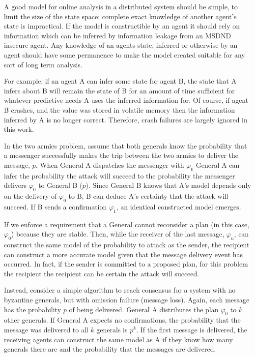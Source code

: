 A good model for online analysis in a distributed system should be simple, to limit the size of the state space: complete exact knowledge of another agent's state is impractical. If the model is constructible by an agent it should rely on information which can be inferred by information leakage from an MSDND insecure agent. Any knowledge of an agents state, inferred or otherwise by an agent should have some permanence to make the model created suitable for any sort of long term analysis. 

For example, if an agent A can infer some state for agent B, the state that A infers about B will remain the state of B for an amount of time sufficient for whatever predictive needs A uses the inferred information for. Of course, if agent B crashes, and the value was stored in volatile memory then the information inferred by A is no longer correct. Therefore, crash failures are largely ignored in this work.

In the two armies problem, assume that both generals know the probability that a messenger successfully makes the trip between the two armies to deliver the message, $p$. When General A dispatches the messenger with $\varphi_0$ General A can infer the probability the attack will succeed to the probability the messenger delivers $\varphi_0$ to General B ($p$). Since General B knows that A's model depends only on the delivery of $\varphi_0$ to B, B can deduce A's certainty that the attack will succeed. If B sends a confirmation $\varphi_1$, an identical constructed model emerges.

If we enforce a requirement that a General cannot reconsider a plan (in this case, $\varphi_0$) because they are stable. Then, while the receiver of the last message, $\varphi_n$, can construct the same model of the probability to attack as the sender, the recipient can construct a more accurate model given that the message delivery event has occurred. In fact, if the sender is committed to a proposed plan, for this problem the recipient the recipient can be certain the attack will succeed.

Instead, consider a simple algorithm to reach consensus for a system with no byzantine generals, but with omission failure (message loss). Again, each message has the probability $p$ of being delivered. General A distributes the plan $\varphi_0$ to $k$ other generals. If General A expects no confirmations, the probability that the message was delivered to all $k$ generals is $p^k$. If the first message is delivered, the receiving agents can construct the same model as A if they know how many generals there are and the probability that the messages are delivered.

